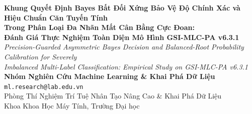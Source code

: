 \documentclass[10pt,a4paper,twoside]{article}
\begin{document}
\thispagestyle{firstpage}

\begin{center}
    {\LARGE\bfseries Khung Quyết Định Bayes Bất Đối Xứng Bảo Vệ Độ Chính Xác và Hiệu Chuẩn Căn Tuyến Tính\\ Trong Phân Loại Đa Nhãn Mất Cân Bằng Cực Đoan:\\[0.3em] Đánh Giá Thực Nghiệm Toàn Diện Mô Hình GSI-MLC-PA v6.3.1}\\[0.6em]
    {\large\textit{Precision-Guarded Asymmetric Bayes Decision and Balanced-Root Probability Calibration for Severely\\ Imbalanced Multi-Label Classification: Empirical Study on GSI-MLC-PA v6.3.1}}\\[0.9em]
    {\textbf{Nhóm Nghiên Cứu Machine Learning \& Khai Phá Dữ Liệu}}\\[0.2em]
    {\texttt{ml.research@lab.edu.vn}}\\[0.2em]
    {\small Phòng Thí Nghiệm Trí Tuệ Nhân Tạo Nâng Cao \& Khai Phá Dữ Liệu}\\[0.1em]
    {\small Khoa Khoa Học Máy Tính, Trường Đại học}\\[0.8em]
\end{center}
\end{document}
